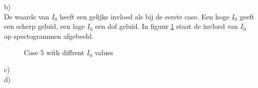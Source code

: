 \documentclass{article}
\begin{document}
b)\\
De waarde van $I_0$ heeft een gelijke invloed als bij de eerste case. Een hoge $I_0$ geeft een scherp geluid, een lage $I_0$ een dof geluid. In figuur \ref{fig:case5b} staat de invloed van $I_0$ op spectogrammen afgebeeld.

\begin{figure}[h]
  \centering
  \caption{Case 5 with diffrent $I_0$ values}
  \label{fig:case5b}
\end{figure}
c)\\
d)\\
\end{document}
